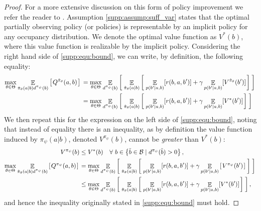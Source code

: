 \begin{proof}
For a more extensive discussion on this form of policy improvement we refer the reader to \citet{pmlr-v125-agarwal20a,bertsekas1991analysis,bertsekas2011approximate}. Assumption \ref{supp:assump:suff_var} states that the optimal partially observing policy (or policies) is representable by an implicit policy for any occupancy distribution.  We denote the optimal value function as $V^*(b)$, where this value function is realizable by the implicit policy.  Considering the right hand side of \eqref{supp:equ:bound}, we can write, by definition, the following equality: 
\begin{align}
    \max_{\theta \in \Theta} \mathop{\mathbb{E}}_{\hat{\pi}_\theta(a|b) d^{\pi_{\psi}}(b)} \left[ \hspace*{0.1em}{}  Q^{{\hat{\pi}_{\theta}}}(a,b) \hspace*{0.1em} \right]{} 
    &= 
    \max_{\theta \in \Theta} \mathop{\mathbb{E}}_{d^{\pi_{\psi}}(b)} \left[ \hspace*{0.1em}{}  
    \mathop{\mathbb{E}}_{\hat{\pi}_\theta(a|b)}\left[ \hspace*{0.1em}{}  
    \mathop{\mathbb{E}}_{p(b'|a,b)}[r(b,a,b')] + \gamma  \mathop{\mathbb{E}}_{p(b'|a,b)}[V^{\hat{\pi}_{\theta}}(b')] \hspace*{0.1em} \right]{} \hspace*{0.1em} \right]{}  
    \\
    &=
    \max_{\theta \in \Theta} \mathop{\mathbb{E}}_{d^{\pi_{\psi}}(b)} \left[ \hspace*{0.1em}{}  
    \mathop{\mathbb{E}}_{\hat{\pi}_\theta(a|b)}\left[ \hspace*{0.1em}{}  
    \mathop{\mathbb{E}}_{p(b'|a,b)}[r(b,a,b')] + \gamma  \mathop{\mathbb{E}}_{p(b'|a,b)}[V^{*}(b')] \hspace*{0.1em} \right]{} \hspace*{0.1em} \right]{} 
\end{align}
We then repeat this for the expression on the left side of \eqref{supp:equ:bound}, noting that instead of equality there is an inequality, as by definition the value function induced by $\pi_{\psi}(a|b)$, denoted $V^{\pi_{\psi}}(b)$, cannot be \emph{greater} than $V^*(b)$:
\begin{align}
     \quad V^{\pi_{\psi}}(b) &\leq  V^{*}(b) \quad \forall \ b \in \left\lbrace \tilde{b} \in \mathcal{B} \mid d^{\pi_{\psi}}(\tilde{b}) > 0 \right\rbrace, \\
    \max_{\theta \in \Theta} \mathop{\mathbb{E}}_{\hat{\pi}_\theta(a|b) d^{\pi_{\psi}}(b)} \left[ \hspace*{0.1em}{}  Q^{{\pi_\psi}}(a,b) \hspace*{0.1em} \right]{} 
    &= 
    \max_{\theta \in \Theta} \mathop{\mathbb{E}}_{d^{\pi_{\psi}}(b)} \left[ \hspace*{0.1em}{}  
    \mathop{\mathbb{E}}_{\hat{\pi}_\theta(a|b)}\left[ \hspace*{0.1em}{}  
    \mathop{\mathbb{E}}_{p(b'|a,b)}[r(b,a,b')] + \gamma \mathop{\mathbb{E}}_{p(b'|a,b)} \left[ \hspace*{0.1em}{}  V^{\pi_{\psi}}(b')\hspace*{0.1em} \right]{}  \hspace*{0.1em} \right]{} \hspace*{0.1em} \right]{}  \\
    &\leq \max_{\theta \in \Theta} \mathop{\mathbb{E}}_{d^{\pi_{\psi}}(b)} \left[ \hspace*{0.1em}{}  
    \mathop{\mathbb{E}}_{\hat{\pi}_\theta(a|b)}\left[ \hspace*{0.1em}{}  
    \mathop{\mathbb{E}}_{p(b'|a,b)}[r(b,a,b')] + \gamma  \mathop{\mathbb{E}}_{p(b'|a,b)}[V^{*}(b')] \hspace*{0.1em} \right]{} \hspace*{0.1em} \right]{} ,
\end{align}
and hence the inequality originally stated in \eqref{supp:equ:bound} must hold.
\end{proof}

